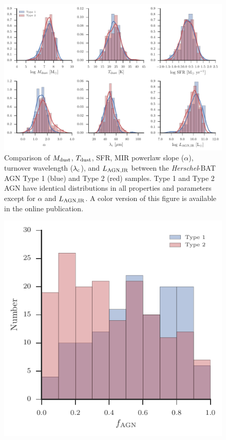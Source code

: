 \documentclass[fleqn, usenatbib]{mnras}
\newcommand{\herschel}{\emph{Herschel}}
\begin{document}
\begin{figure}
\includegraphics[width=\textwidth]{figures/agn_type_comparison}
\caption{Comparison of $M_{\rm dust}$, $T_{\rm dust}$, SFR, MIR powerlaw slope ($\alpha$), turnover wavelength ($\lambda_{\rm c}$), and $L_{\rm AGN,IR}$ between the \herschel-BAT AGN Type 1 (blue) and Type 2 (red) samples. Type 1 and Type 2 AGN have identical distributions in all properties and parameters except for $\alpha$ and $L_{\rm AGN,IR}$. A color version of this figure is available in the online publication. \label{fig:agn_type_comp}}
\end{figure}

\begin{figure}
\includegraphics[width=\columnwidth]{figures/fagn_ir_seyferts}
\caption{\label{fig:frac_agn_seyferts}}
\end{figure}
\end{document}
